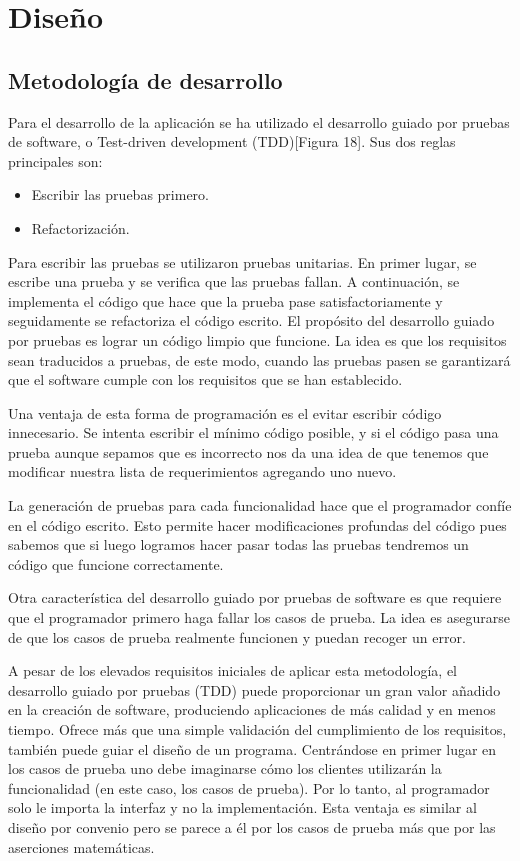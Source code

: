 \section{Diseño}
\label{section:diseno}

\subsection{Metodología de desarrollo}
\label{sec:metodologia_desarrollo}
Para el desarrollo de la aplicación se ha utilizado el desarrollo guiado por pruebas de software, o Test-driven development (TDD)[Figura 18]. Sus dos reglas principales son:
\begin{itemize}
 \item Escribir las pruebas primero.
 \item Refactorización.
\end{itemize}

Para escribir las pruebas se utilizaron pruebas unitarias. En primer lugar, se escribe una prueba y se verifica que las pruebas fallan. A continuación, se implementa el código que hace que la prueba pase satisfactoriamente y seguidamente se refactoriza el código escrito. El propósito del desarrollo guiado por pruebas es lograr un código limpio que funcione. La idea es que los requisitos sean traducidos a pruebas, de este modo, cuando las pruebas pasen se garantizará que el software cumple con los requisitos que se han establecido.

Una ventaja de esta forma de programación es el evitar escribir código innecesario. Se intenta escribir el mínimo código posible, y si el código pasa una prueba aunque sepamos que es incorrecto nos da una idea de que tenemos que modificar nuestra lista de requerimientos agregando uno nuevo.

La generación de pruebas para cada funcionalidad hace que el programador confíe en el código escrito. Esto permite hacer modificaciones profundas del código pues sabemos que si luego logramos hacer pasar todas las pruebas tendremos un código que funcione correctamente.

Otra característica del desarrollo guiado por pruebas de software es que requiere que el programador primero haga fallar los casos de prueba. La idea es asegurarse de que los casos de prueba realmente funcionen y puedan recoger un error.

A pesar de los elevados requisitos iniciales de aplicar esta metodología, el desarrollo guiado por pruebas (TDD) puede proporcionar un gran valor añadido en la creación de software, produciendo aplicaciones de más calidad y en menos tiempo. Ofrece más que una simple validación del cumplimiento de los requisitos, también puede guiar el diseño de un programa. Centrándose en primer lugar en los casos de prueba uno debe imaginarse cómo los clientes utilizarán la funcionalidad (en este caso, los casos de prueba). Por lo tanto, al programador solo le importa la interfaz y no la implementación. Esta ventaja es similar al diseño por convenio pero se parece a él por los casos de prueba más que por las aserciones matemáticas.

